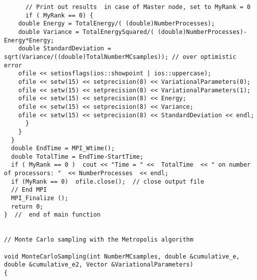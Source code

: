 \documentclass[%
oneside,                 %
final,                   %
10pt]{article}
\begin{document}
\begin{verbatim}
      // Print out results  in case of Master node, set to MyRank = 0
      if ( MyRank == 0) {
	double Energy = TotalEnergy/( (double)NumberProcesses);
	double Variance = TotalEnergySquared/( (double)NumberProcesses)-Energy*Energy;
	double StandardDeviation = sqrt(Variance/((double)TotalNumberMCsamples)); // over optimistic error
	ofile << setiosflags(ios::showpoint | ios::uppercase);
	ofile << setw(15) << setprecision(8) << VariationalParameters(0);
	ofile << setw(15) << setprecision(8) << VariationalParameters(1);
	ofile << setw(15) << setprecision(8) << Energy;
	ofile << setw(15) << setprecision(8) << Variance;
	ofile << setw(15) << setprecision(8) << StandardDeviation << endl;
      }
    }
  }
  double EndTime = MPI_Wtime();
  double TotalTime = EndTime-StartTime;
  if ( MyRank == 0 )  cout << "Time = " <<  TotalTime  << " on number of processors: "  << NumberProcesses  << endl;
  if (MyRank == 0)  ofile.close();  // close output file
  // End MPI
  MPI_Finalize ();  
  return 0;
}  //  end of main function


// Monte Carlo sampling with the Metropolis algorithm  

void MonteCarloSampling(int NumberMCsamples, double &cumulative_e, double &cumulative_e2, Vector &VariationalParameters)
{


\end{verbatim}
\end{document}
